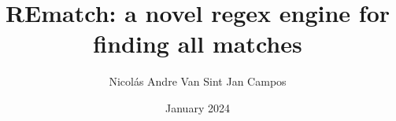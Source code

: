 
\title[REmatch: a novel regex engine for finding all matches]
{\bf REmatch: a novel regex engine for finding all matches}
\author[Nicolás Andre Van Sint Jan Campos]{Nicolás Andre Van Sint Jan Campos}

\address{Escuela de Ingeniería\\
Pontificia Universidad Católica de Chile\\
Vicuña Mackenna 4860\\
Santiago, Chile\\
{\it Tel.\/} : 56 (2) 354-2000}

\subject                            {Computer Science}
\date                               {January 2024}
\dedication                         {To my parents, Franz and Daniela.}


\NoChapterPageNumber
\fancyhf{}
\fancyfoot[C]{\fontsize{11pt}{11pt}\selectfont\thepage}
\maketitle
\topmargin -20mm
\headheight 7mm
\headsep 20mm
\oddsidemargin 7.3mm



